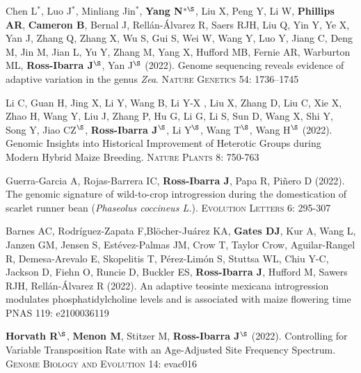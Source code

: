 \documentclass[letterpaper,10pt]{article}
\begin{document}
\begin{etaremune}
\item Chen L$^*$, Luo J$^*$, Minliang Jin$^*$, \textbf{Yang N$^{*\S}$}, Liu X, Peng Y, Li W, \textbf{Phillips AR}, \textbf{Cameron B}, Bernal J, Rell\'{a}n-\'{A}lvarez R, Saers RJH, Liu Q, Yin Y, Ye X, Yan J, Zhang Q, Zhang X, Wu S, Gui S, Wei W, Wang Y, Luo Y, Jiang C, Deng M, Jin M, Jian L, Yu Y, Zhang M, Yang X, Hufford MB, Fernie AR, Warburton ML, \textbf{Ross-Ibarra J$^\S$}, Yan J$^\S$ (2022). Genome sequencing reveals evidence of adaptive variation in the genus \textit{Zea}. \textsc{Nature Genetics} 54: 1736–1745

\item Li C, Guan H, Jing X, Li Y, Wang B, Li Y-X , Liu X, Zhang D, Liu C, Xie X, Zhao H, Wang Y, Liu J, Zhang P, Hu G, Li G, Li S, Sun D, Wang X, Shi Y, Song Y, Jiao CZ$^\S$, \textbf{Ross-Ibarra J}$^\S$, Li Y$^\S$, Wang T$^\S$, Wang H$^\S$ (2022). Genomic Insights into Historical Improvement of Heterotic Groups during Modern Hybrid Maize Breeding. \textsc{Nature Plants} 8: 750-763

\item Guerra-Garcia A, Rojas-Barrera IC, \textbf{Ross-Ibarra J}, Papa R, Pi\~nero D (2022). The genomic signature of wild-to-crop introgression during the domestication of scarlet runner bean (\textit{Phaseolus coccineus L.}). \textsc{Evolution Letters} 6: 295-307 %

\item Barnes AC, Rodr\'iguez-Zapata F,Bl\"{o}cher-Ju\'arez KA, \textbf{Gates DJ}, Kur A,  Wang L, Janzen GM,  Jensen S, Est\'evez-Palmas JM, Crow T, Taylor Crow, Aguilar-Rangel R, Demesa-Arevalo E, Skopelitis T, P\'erez-Lim\'on S, Stuttsa WL, Chiu Y-C, Jackson D, Fiehn O, Runcie D, Buckler ES, \textbf{Ross-Ibarra J}, Hufford M, Sawers RJH, Rell\'an-\'Alvarez R (2022). An adaptive teosinte mexicana introgression modulates phosphatidylcholine levels and is associated with maize flowering time \textsc{PNAS} 119: e2100036119  %

\item \textbf{Horvath R}$^\S$, \textbf{Menon M}, Stitzer M, \textbf{Ross-Ibarra J}$^\S$ (2022). Controlling for Variable Transposition Rate with an Age-Adjusted Site Frequency Spectrum. \textsc{Genome Biology and Evolution}  14: evac016 %


\end{etaremune}
\end{document}
